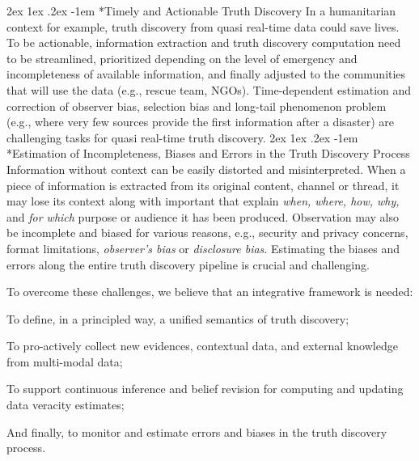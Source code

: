 \documentclass[prodmode,acmtecs]{acmsmall} %
\makeatletter
\renewcommand\paragraph{\@startsection{paragraph}{5}{\z@}%
                                       {2ex \@plus1ex \@minus .2ex}%
                                       {-1em}%
                                      {\sffamily\normalsize\bfseries}}
\makeatother
\begin{document}
\paragraph*{Timely and Actionable Truth Discovery} 
In a humanitarian context for example, truth discovery from quasi real-time data could save lives. To be actionable, information extraction and 
truth discovery computation need to be streamlined, prioritized depending on the level of emergency and incompleteness of available information,
and finally adjusted to the communities that will use the data (e.g., rescue team, NGOs). Time-dependent estimation and correction of observer bias,
selection bias and long-tail phenomenon problem (e.g., where very few sources provide the first information after a disaster) are challenging tasks 
for quasi real-time truth discovery.
%
\paragraph*{Estimation of Incompleteness, Biases and Errors in the Truth Discovery Process}  
Information without context can be easily distorted and misinterpreted.
When a piece of information is extracted from its original 
content, channel or thread, it may lose its context along with important 
 that explain \emph{when, where, how, why,} and
\emph{for which} purpose or audience it has been produced. Observation may also be incomplete and biased for various 
reasons, e.g., security and privacy concerns, format limitations, \emph{observer's bias} or \emph{disclosure bias}. 
Estimating the biases and errors along the entire truth discovery pipeline is crucial and challenging.
%

To overcome these challenges, we believe that an integrative framework is needed:
\begin{inparaenum}[(i)]
\item To define, in a principled way, a unified semantics of truth discovery;
\item To pro-actively collect new evidences, contextual data, and external knowledge from multi-modal data; 
\item To support continuous inference and belief revision for computing and updating data veracity estimates;
\item And finally, to monitor and estimate errors and biases in the truth discovery process.
\end{inparaenum}
\end{document}
